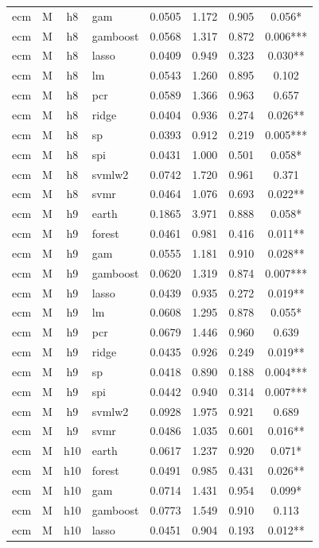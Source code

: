 \begin{ThreePartTable}
\begin{longtable}[t]{llclcccc}
ecm & M & h8 & gam & 0.0505 & 1.172 & 0.905 & 0.056*\\
ecm & M & h8 & gamboost & 0.0568 & 1.317 & 0.872 & 0.006***\\
ecm & M & h8 & lasso & 0.0409 & 0.949 & 0.323 & 0.030**\\
ecm & M & h8 & lm & 0.0543 & 1.260 & 0.895 & 0.102\\
ecm & M & h8 & pcr & 0.0589 & 1.366 & 0.963 & 0.657\\
ecm & M & h8 & ridge & 0.0404 & 0.936 & 0.274 & 0.026**\\
ecm & M & h8 & sp & 0.0393 & 0.912 & 0.219 & 0.005***\\
ecm & M & h8 & spi & 0.0431 & 1.000 & 0.501 & 0.058*\\
ecm & M & h8 & svmlw2 & 0.0742 & 1.720 & 0.961 & 0.371\\
ecm & M & h8 & svmr & 0.0464 & 1.076 & 0.693 & 0.022**\\
\addlinespace
ecm & M & h9 & earth & 0.1865 & 3.971 & 0.888 & 0.058*\\
ecm & M & h9 & forest & 0.0461 & 0.981 & 0.416 & 0.011**\\
ecm & M & h9 & gam & 0.0555 & 1.181 & 0.910 & 0.028**\\
ecm & M & h9 & gamboost & 0.0620 & 1.319 & 0.874 & 0.007***\\
ecm & M & h9 & lasso & 0.0439 & 0.935 & 0.272 & 0.019**\\
ecm & M & h9 & lm & 0.0608 & 1.295 & 0.878 & 0.055*\\
ecm & M & h9 & pcr & 0.0679 & 1.446 & 0.960 & 0.639\\
ecm & M & h9 & ridge & 0.0435 & 0.926 & 0.249 & 0.019**\\
ecm & M & h9 & sp & 0.0418 & 0.890 & 0.188 & 0.004***\\
ecm & M & h9 & spi & 0.0442 & 0.940 & 0.314 & 0.007***\\
ecm & M & h9 & svmlw2 & 0.0928 & 1.975 & 0.921 & 0.689\\
ecm & M & h9 & svmr & 0.0486 & 1.035 & 0.601 & 0.016**\\
\addlinespace
ecm & M & h10 & earth & 0.0617 & 1.237 & 0.920 & 0.071*\\
ecm & M & h10 & forest & 0.0491 & 0.985 & 0.431 & 0.026**\\
ecm & M & h10 & gam & 0.0714 & 1.431 & 0.954 & 0.099*\\
ecm & M & h10 & gamboost & 0.0773 & 1.549 & 0.910 & 0.113\\
ecm & M & h10 & lasso & 0.0451 & 0.904 & 0.193 & 0.012**\\

\end{longtable}
\end{ThreePartTable}
